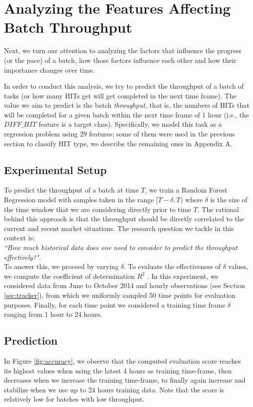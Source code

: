 \section{Analyzing the Features Affecting Batch Throughput}
\label{sec:throughput}
Next, we turn our attention to analyzing the factors that influence the progress (or the pace) of a batch, how those factors influence each other and how their importance changes over time. 

In order to conduct this analysis, we try to predict the throughput of a batch of tasks (or how many HITs get will get completed in the next time frame). 
The value we aim to predict is the batch \emph{throughput}, that is, the numbers of HITs that  will be completed for a given batch within the next time frame of 1 hour (i.e.,  the $DIFF\_HIT$ feature is a target class).
Specifically, we model this task as a regression problem using 29 features; some of them were used in the previous section to classify HIT type, we describe the remaining ones in Appendix A.

\subsection{Experimental Setup}

To predict the throughput of a batch at time $T$, we train a Random Forest Regression model with samples taken in the range $[T-\delta, T)$ where $\delta$ is the size of the time window that we are   considering directly prior to time $T$. The rational behind this approach is that the throughput should be directly correlated to the current and recent market situations. 
The research question we tackle in this context is:\\ \emph{``How much historical data does one need to consider to predict the throughput effectively?"}. \\ To answer this, we proceed by varying $\delta$.
To evaluate the effectiveness of $\delta$ values, we compute the coefficient of determination  $R^2$ \cite{sklearnweb, sklearn}.
In this experiment, we considered  data from June to October 2014 and hourly observations (see Section \ref{sec:tracker}), from which we uniformly sampled 50 time points for evaluation purposes. Finally, for each time point we considered a training time frame $\delta$ ranging from 1 hour to 24 hours. 

\subsection{Prediction}
In Figure \ref{fig:accuracy}, we observe that the computed evaluation score reaches its highest values when using the latest 4 hours as training time-frame, then decreases when we increase the training time-frame, to finally again increase and stabilize when we use up to 24 hours training data.
Note that the score is relatively low for batches with low throughput. 

